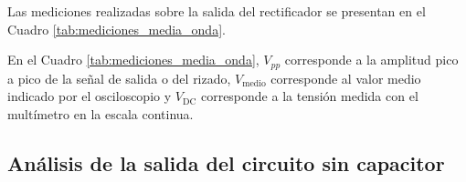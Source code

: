 Las mediciones realizadas sobre la salida del rectificador se presentan en el Cuadro \ref{tab:mediciones_media_onda}.

\begin{table}[H]
    \centering
    \renewcommand{\arraystretch}{1.4}
    \setlength{\arrayrulewidth}{0.5pt}


    \caption{Mediciones de la tensión de salida del rectificador de
    media onda.}
    \label{tab:mediciones_media_onda}
\end{table}

En el Cuadro \ref{tab:mediciones_media_onda}, $V_{pp}$ corresponde a la amplitud pico a pico de la señal de salida o del rizado, $V_{\mathrm{medio}}$ corresponde al valor medio indicado por el osciloscopio y $V_{\mathrm{DC}}$ corresponde a la tensión medida con el
multímetro en la escala continua.

\subsection{Análisis de la salida del circuito sin capacitor}

